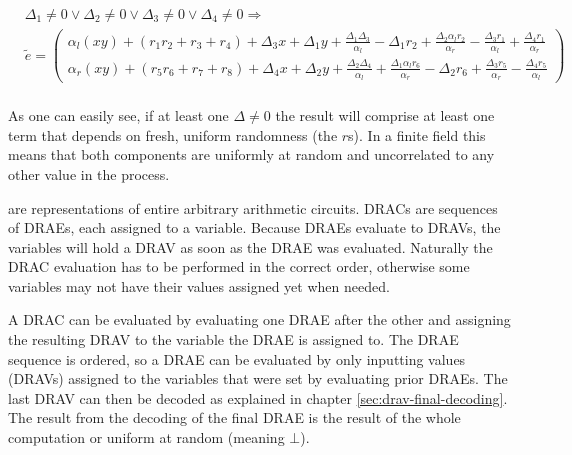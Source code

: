 \begin{align*}
  &
  \Delta_1 \neq 0 \vee \Delta_2 \neq 0 \vee
  \Delta_3 \neq 0 \vee \Delta_4 \neq 0
  \Rightarrow \\
  &
  \widetilde{e} =
  \begin{pmatrix}
    \alpha_l(xy) + (r_1r_2 + r_3 + r_4)
    + \Delta_3x + \Delta_1y
    + \frac{\Delta_1\Delta_3}{\alpha_l}
    - \Delta_1r_2
    + \frac{\Delta_2\alpha_lr_2}{\alpha_r}
    - \frac{\Delta_3r_1}{\alpha_l}
    + \frac{\Delta_4r_1}{\alpha_r}
    \\
    \alpha_r(xy) + (r_5r_6 + r_7 + r_8)
    + \Delta_4x + \Delta_2y
    + \frac{\Delta_2\Delta_4}{\alpha_l}
    + \frac{\Delta_1\alpha_lr_6}{\alpha_r}
    - \Delta_2r_6
    + \frac{\Delta_3r_5}{\alpha_r}
    - \frac{\Delta_4r_5}{\alpha_l}
  \end{pmatrix} \\
\end{align*}

\noindent{}As one can easily see, if at least one $\Delta \neq 0$ the result
will comprise at least one term that depends on fresh, uniform randomness (the
$r$s). In a finite field this means that both components are uniformly at random
and uncorrelated to any other value in the process.


%
%
\label{sec:drac}

 are representations of entire
arbitrary arithmetic circuits. DRACs are sequences of DRAEs, each assigned to a
variable. Because DRAEs evaluate to DRAVs, the variables will hold a DRAV as
soon as the DRAE was evaluated. Naturally the DRAC evaluation has to be
performed in the correct order, otherwise some variables may not have their
values assigned yet when needed.


\label{sec:DRAC-eval}

A DRAC can be evaluated by evaluating one DRAE after the other and assigning the
resulting DRAV to the variable the DRAE is assigned to. The DRAE sequence is
ordered, so a DRAE can be evaluated by only inputting values (DRAVs) assigned to
the variables that were set by evaluating prior DRAEs. The last DRAV can then be
decoded as explained in chapter \ref{sec:drav-final-decoding}. The result from
the decoding of the final DRAE is the result of the whole computation or uniform
at random (meaning $\bot$).


%
%
\label{sec:OPE}

